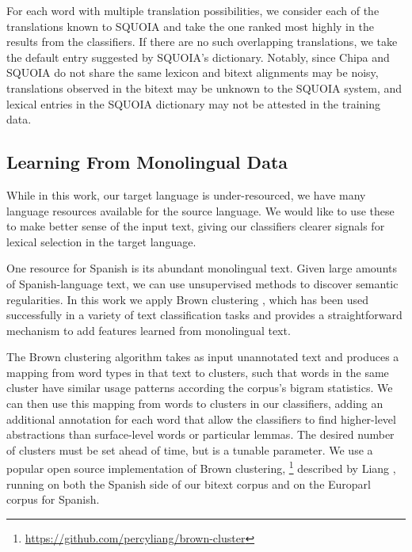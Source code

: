 \documentclass[10pt, a4paper]{article}
\begin{document}
For each word with multiple translation possibilities, we consider each of the
translations known to SQUOIA and take the one ranked most highly in the
results from the classifiers. If there are no such overlapping translations, we
take the default entry suggested by SQUOIA's dictionary.
Notably, since Chipa and SQUOIA do not share the same lexicon and bitext alignments
may be noisy, translations
observed in the bitext may be unknown to the SQUOIA system, and lexical entries in the
SQUOIA dictionary may not be attested in the training data.

\subsection{Learning From Monolingual Data}
While in this work, our target language is under-resourced, we have many
language resources available for the source language. We would like to use these to
make better sense of the input text, giving our classifiers clearer signals for
lexical selection in the target language.

One resource for Spanish is its abundant monolingual text. Given
large amounts of Spanish-language text, we can use unsupervised methods to
discover semantic regularities. In this work we apply Brown clustering
\cite{Brown92class-basedn-gram}, which has been used successfully in a variety
of text classification tasks \cite{turian-ratinov-bengio:2010:ACL} and provides
a straightforward mechanism to add features learned from monolingual text.

The Brown clustering algorithm takes as input unannotated text and produces a
mapping from word types in that text to clusters, such that words in the same
cluster have similar usage patterns according the corpus's bigram statistics.
We can then use this mapping from words to clusters in our classifiers, adding
an additional annotation for each word that allow the classifiers to find
higher-level abstractions than surface-level words or particular lemmas.
The desired number of clusters must be set ahead of time, but is a tunable
parameter.
We use a popular open source implementation of Brown clustering,
\footnote{\url{https://github.com/percyliang/brown-cluster}} described by
Liang , running on both the Spanish
side of our bitext corpus and on the Europarl corpus \cite{europarl} for
Spanish.
\end{document}
